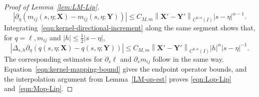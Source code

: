 \documentclass[11pt,reqno]{amsart}
\theoremstyle{plain}
\theoremstyle{definition}
\numberwithin{equation}{section}
\newcommand{\paren}[1]{\left(#1\right)}
\newcommand{\p}{\partial}
\newcommand{\bm}[1]{\boldsymbol{#1}}
\newcommand{\abs}[1]{\left\lvert #1 \right\rvert}
\newcommand{\norm}[1]{\left\lVert #1 \right\rVert}
\newcommand{\ci}[1]{C^{#1}(I)}
\begin{document}
\begin{proof}[Proof of Lemma~\ref{lem:LM-Lip}]
\begin{equation}
    \abs{\p_\eta\paren{m_{ij}(s,\eta;\bm X)-m_{ij}(s,\eta;\bm Y)}}
    \le C_{M,m}
    \norm{\bm X'-\bm Y'}_{\ci{0,\alpha}}
    \abs{s-\eta}^{\alpha-1}.
\end{equation}
Integrating~\eqref{eqn:kernel-directional-increment} along the same segment shows that,
for $q=\ell,m_{ij}$ and $\abs h\le\frac12\abs{s-\eta}$,
\begin{equation}
    \abs{\Delta_{s,h}\p_\eta
    \paren{q(s,\eta;\bm X)-q(s,\eta;\bm Y)}}
    \le C_{M,m}
    \norm{\bm X'-\bm Y'}_{\ci{0,\alpha}}
    \abs h^\alpha\abs{s-\eta}^{-1}.
\end{equation}
The corresponding estimates for $\p_s\ell$ and $\p_sm_{ij}$ follow in the same
way. Equation~\eqref{eqn:kernel-mapping-bound} gives the endpoint operator bounds, and the
interpolation argument from Lemma~\ref{LM-op-est} proves
\eqref{eqn:Lop-Lip} and~\eqref{eqn:Mop-Lip}.
\end{proof}
\end{document}
